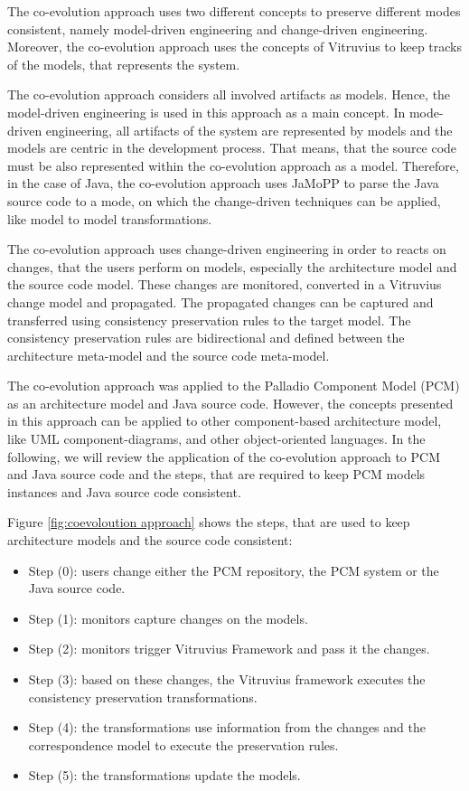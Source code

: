 The co-evolution approach uses two different concepts to preserve different modes consistent, namely model-driven engineering and change-driven engineering. Moreover, the co-evolution approach uses the concepts of Vitruvius to keep tracks of the models, that represents the system. 

The co-evolution approach considers all involved artifacts as models. Hence, the model-driven engineering is used in this approach as a main concept. In mode-driven engineering, all artifacts of the system are represented by models and the models are centric in the development process. That means, that the source code must be also represented within the co-evolution approach as a model. Therefore, in the case of Java, the co-evolution approach uses JaMoPP to parse the Java source code to a mode, on which the change-driven techniques can be applied, like model to model transformations.

The co-evolution approach uses change-driven engineering in order to reacts on changes, that the users perform on models, especially the architecture model and the source code model. These changes are monitored, converted in a Vitruvius change model and propagated. The propagated changes can be captured and transferred using consistency preservation rules to the target model. The consistency preservation rules are bidirectional and defined between the architecture meta-model and the source code meta-model.

The co-evolution approach was applied to the Palladio Component Model (PCM) as an architecture model and Java source code.  However, the concepts presented in this approach can be applied to other component-based architecture model, like UML component-diagrams, and other object-oriented languages. In the following, we will review the application of the co-evolution approach to PCM and Java source code and the steps, that are required to keep PCM models instances and Java source code consistent. 



Figure  \ref{fig:coevoloution approach} shows the steps, that are used to keep architecture models and the source code consistent:

\begin{itemize}
\item Step (0): users change either the PCM repository, the PCM system or the Java source code.  
\item Step (1): monitors capture changes on the models.
\item Step (2):  monitors trigger Vitruvius Framework and pass it the changes.
\item Step (3): based on these changes, the Vitruvius framework executes the consistency preservation transformations. 
\item Step (4): the transformations use information from the changes and the correspondence model to execute the preservation rules.
\item Step (5): the transformations update the models. 
\end{itemize}

